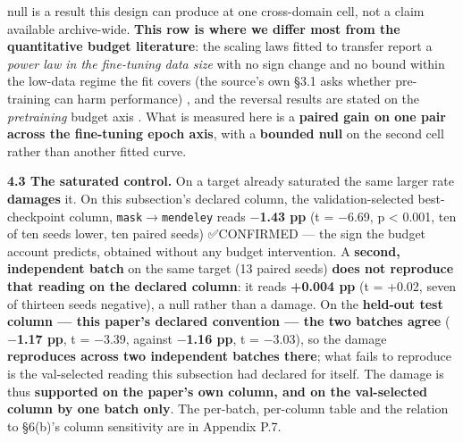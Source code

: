 \documentclass[pdflatex,sn-mathphys-ay]{sn-jnl}
\begin{document}
null is a result this design can produce at one cross-domain cell, not a claim available archive-wide. \textbf{This row is where we differ most from the quantitative budget literature}: the scaling laws fitted to transfer report a \emph{power law in the fine-tuning data size} with no sign change and no bound within the low-data regime the fit covers (the source's own \S{}3.1 asks whether pre-training can harm performance) \citep{hernandez2021}, and the reversal results are stated on the \emph{pretraining} budget axis \citep{springer2025,everett2026}. What is measured here is a \textbf{paired gain on one pair across the fine-tuning epoch axis}, with a \textbf{bounded null} on the second cell rather than another fitted curve.

\textbf{4.3 The saturated control.} On a target already saturated the same larger rate \textbf{damages} it. On this subsection's declared column, the validation-selected best-checkpoint column, \texttt{mask\ensuremath{\rightarrow}mendeley} reads \textbf{\ensuremath{-}1.43 pp} (t = \ensuremath{-}6.69, p \textless{} 0.001, ten of ten seeds lower, ten paired seeds) ✅CONFIRMED --- the sign the budget account predicts, obtained without any budget intervention. A \textbf{second, independent batch} on the same target (13 paired seeds) \textbf{does not reproduce that reading on the declared column}: it reads \textbf{+0.004 pp} (t = +0.02, seven of thirteen seeds negative), a null rather than a damage. On the \textbf{held-out test column --- this paper's declared convention --- the two batches agree} (\textbf{\ensuremath{-}1.17 pp}, t = \ensuremath{-}3.39, against \textbf{\ensuremath{-}1.16 pp}, t = \ensuremath{-}3.03), so the damage \textbf{reproduces across two independent batches there}; what fails to reproduce is the val-selected reading this subsection had declared for itself. The damage is thus \textbf{supported on the paper's own column, and on the val-selected column by one batch only}. The per-batch, per-column table and the relation to \S{}6(b)'s column sensitivity are in Appendix P.7.
\end{document}
